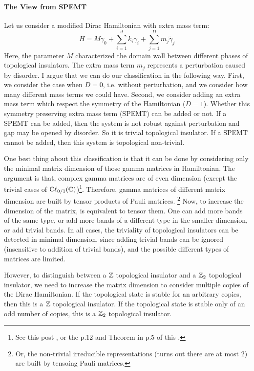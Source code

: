 \paragraph{The View from SPEMT} Let us consider a modified Dirac Hamiltonian
with extra mass term:
\begin{equation}
    \label{eq:H-spemt}
    H = M\tilde{\gamma}_0 + \sum_{i=1}^{d} k_i \gamma_i 
    + \sum_{j=1}^D m_j\tilde{\gamma}_j
\end{equation}
Here, the parameter $M$ characterized the domain wall between different phases
of topological insulators. The extra mass term $m_j$ represents a perturbation
caused by disorder. I argue that we can do our classification in the following
way. First, we consider the case when $D=0$, i.e. without perturbation, and we
consider how many different mass terms we could have. Second, we consider adding
an extra mass term which respect the symmetry of the Hamiltonian ($D=1$).
Whether this symmetry preserving extra mass term (SPEMT) can be added or not. If
a SPEMT can be added, then the system is not robust against perturbation and gap
may be opened by disorder. So it is trivial topological insulator. If a SPEMT
cannot be added, then this system is topological non-trivial. 

One best thing about this classification is that it can be done by considering
only the minimal matrix dimension of those gamma matrices in Hamiltonian. The
argument is that, complex gamma matrices are of even dimension (except the
trivial cases of $\mathrm{C\ell}_{0/1}(\mathbb{C})$)\footnote{See this post
\cite{PhysicsStackExchange}, or the p.12 and Theorem in p.5 of this
\cite{West1998}.}. Therefore, gamma matrices of different
matrix dimension are built by tensor products of Pauli matrices.
\footnote{Or, the non-trivial irreducible representations (turns out there are
at most 2) are built by tensoing Pauli matrices.}
Now, to increase the dimension of the matrix, is equivalent to
tensor them. One can add more bands of the same type, or add more bands of a
different type in the smaller dimension, or add trivial bands. In all cases, the
triviality of topological insulators can be detected in minimal dimension, since
adding trivial bands can be ignored (insensitive to addition of trivial bands),
and the possible different types of matrices are limited.

However, to distinguish between a $\mathbb{Z}$ topological insulator and a $\mathbb{Z}_2$
topological insulator, we need to increase the matrix dimension to consider
multiple copies of the Dirac Hamiltonian. If the topological state is stable for
an arbitrary copies, then this is a $\mathbb{Z}$ topological insulator. If the
topological state is stable only of an odd number of copies, this is a $\mathbb{Z}_2$
topological insulator.

